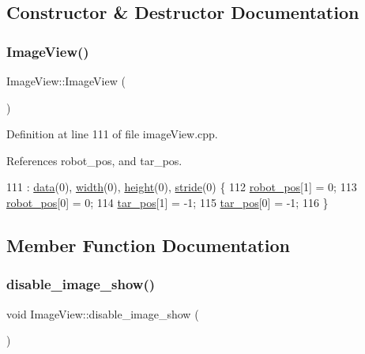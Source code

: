 \subsection{Constructor \& Destructor Documentation}
\mbox{\label{class_image_view_a8382a8ee74d8ff437f0be6cffc2ba957}} 
\subsubsection{\texorpdfstring{Image\+View()}{ImageView()}}
{\footnotesize\ttfamily Image\+View\+::\+Image\+View (\begin{DoxyParamCaption}{ }\end{DoxyParamCaption})}



Definition at line 111 of file image\+View.\+cpp.



References robot\+\_\+pos, and tar\+\_\+pos.


\begin{DoxyCode}
111                      : \hyperlink{class_image_view_aafc2f72cb5d3cbc5f23eb303b30982da}{data}(0), \hyperlink{class_image_view_a5a491c5256173430d4b16d9abea80727}{width}(0), \hyperlink{class_image_view_a3e4a6ddf0a10ae710405cdd6e73924f6}{height}(0), \hyperlink{class_image_view_aee8be5a0041dbc9c04cdc439d08cc3df}{stride}(0) \{
112     \hyperlink{class_image_view_ab97c018602b91e96f318dc92af222aa5}{robot\_pos}[1] = 0;
113     \hyperlink{class_image_view_ab97c018602b91e96f318dc92af222aa5}{robot\_pos}[0] = 0;
114     \hyperlink{class_image_view_a569238a3b9d094c11637673dba40bf29}{tar\_pos}[1] = -1;
115     \hyperlink{class_image_view_a569238a3b9d094c11637673dba40bf29}{tar\_pos}[0] = -1;
116 \}
\end{DoxyCode}


\subsection{Member Function Documentation}
\mbox{\label{class_image_view_a52c3ac86c941bcdfdd4fd8c711e53184}} 
\subsubsection{\texorpdfstring{disable\+\_\+image\+\_\+show()}{disable\_image\_show()}}
{\footnotesize\ttfamily void Image\+View\+::disable\+\_\+image\+\_\+show (\begin{DoxyParamCaption}{ }\end{DoxyParamCaption})}



